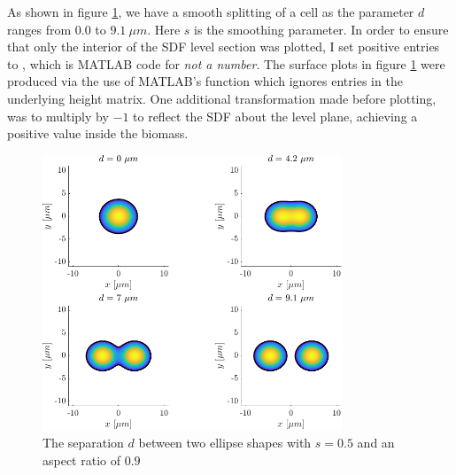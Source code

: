 As shown in figure \ref{fig:mitosisplot}, we have a smooth splitting of a 
cell as the parameter $d$ ranges from $0.0$ to $9.1 \ \mu m$. Here $s$ is the 
smoothing parameter. In order to ensure that only the interior
of the SDF level section was plotted, I set positive entries to ,
which is MATLAB code for \textit{not a number}. The surface plots in figure \ref{fig:mitosisplot}
were produced via the use of MATLAB's  function which ignores  entries
in the underlying height matrix. One additional transformation made before plotting, was to multiply by 
$-1$ to reflect the SDF about the level plane, achieving a positive value inside the biomass.
\begin{figure}[!htb]
    \centering
    \includegraphics[width=0.8\textwidth]{chapter2/figures/mitosisPlot.pdf}
    \caption{The separation $d$ between two ellipse shapes with $s = 0.5$ and 
    an aspect ratio of $0.9$}
    \label{fig:mitosisplot}
\end{figure}
\\

